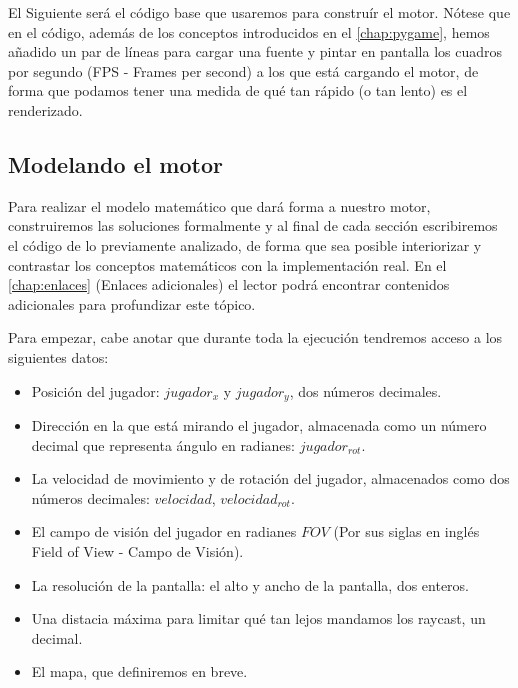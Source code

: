 El Siguiente será el código base que usaremos para construír el motor. Nótese que en el código, además de los conceptos introducidos en el \autoref{chap:pygame}, hemos añadido un par de líneas para cargar una fuente y pintar en pantalla los cuadros por segundo (FPS - Frames per second) a los que está cargando el motor, de forma que podamos tener una medida de qué tan rápido (o tan lento) es el renderizado.



\newpage
\subsection{Modelando el motor}

Para realizar el modelo matemático que dará forma a nuestro motor, construiremos las soluciones formalmente y al final de cada sección escribiremos el código de lo previamente analizado, de forma que sea posible interiorizar y contrastar los conceptos matemáticos con la implementación real. En el \autoref{chap:enlaces} (Enlaces adicionales) el lector podrá encontrar contenidos adicionales para profundizar este tópico.

Para empezar, cabe anotar que durante toda la ejecución tendremos acceso a los siguientes datos:

\begin{itemize}
	\item Posición del jugador: $jugador_x$ y $jugador_y$, dos números decimales.
	\item Dirección en la que está mirando el jugador, almacenada como un número decimal que representa ángulo en radianes: $jugador_{rot}$.
	\item La velocidad de movimiento y de rotación del jugador, almacenados como dos números decimales: $velocidad$,  $velocidad_{rot}$. 
	\item El campo de visión del jugador en radianes $FOV$ (Por sus siglas en inglés Field of View - Campo de Visión).
	\item La resolución de la pantalla: el alto y ancho de la pantalla, dos enteros.
	\item Una distacia máxima para limitar qué tan lejos mandamos los raycast, un decimal.
	\item El mapa, que definiremos en breve.
\end{itemize}

